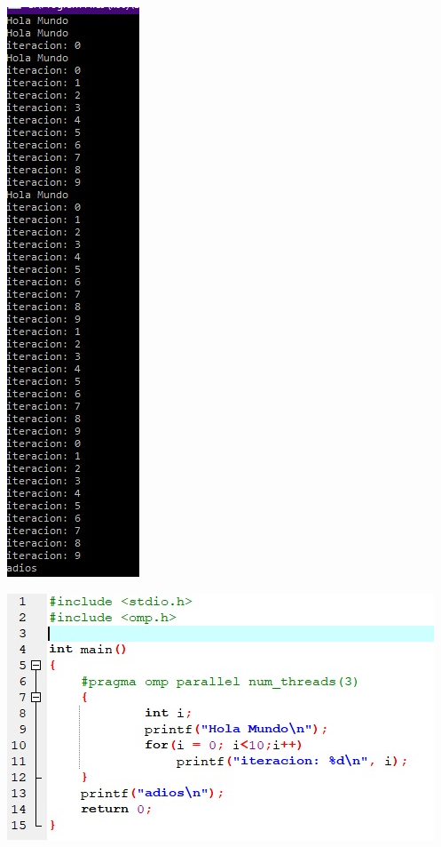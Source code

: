 \documentclass[12pt,letterpaper]{article}
\begin{document}
\begin{flushleft}
\includegraphics[scale=.8]{ejercicio21.jpg} 

\end{flushleft}
\begin{flushleft}
\includegraphics[scale=.8]{ejercicio22.jpg} 

\end{flushleft}
\end{document}
